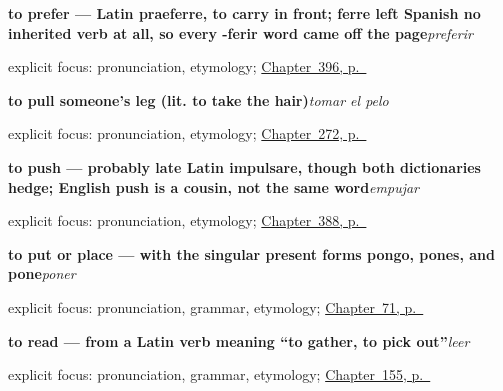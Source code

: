 \noindent\begin{minipage}[t]{\linewidth}
\raggedright
\textbf{to prefer — Latin praeferre, to carry in front; ferre left Spanish no inherited verb at all, so every -ferir word came off the page}\enspace\emph{preferir}\par
\footnotesize explicit focus: pronunciation, etymology; \hyperref[ch:aprender-y-cocinar]{Chapter~396, p.~\pageref*{ch:aprender-y-cocinar}}
\end{minipage}\par\smallskip

\noindent\begin{minipage}[t]{\linewidth}
\raggedright
\textbf{to pull someone's leg (lit. to take the hair)}\enspace\emph{tomar el pelo}\par
\footnotesize explicit focus: pronunciation, etymology; \hyperref[ch:entrelineas]{Chapter~272, p.~\pageref*{ch:entrelineas}}
\end{minipage}\par\smallskip

\noindent\begin{minipage}[t]{\linewidth}
\raggedright
\textbf{to push — probably late Latin impulsare, though both dictionaries hedge; English push is a cousin, not the same word}\enspace\emph{empujar}\par
\footnotesize explicit focus: pronunciation, etymology; \hyperref[ch:empujar-y-lanzar]{Chapter~388, p.~\pageref*{ch:empujar-y-lanzar}}
\end{minipage}\par\smallskip

\noindent\begin{minipage}[t]{\linewidth}
\raggedright
\textbf{to put or place — with the singular present forms pongo, pones, and pone}\enspace\emph{poner}\par
\footnotesize explicit focus: pronunciation, grammar, etymology; \hyperref[ch:spanish-poner]{Chapter~71, p.~\pageref*{ch:spanish-poner}}
\end{minipage}\par\smallskip

\noindent\begin{minipage}[t]{\linewidth}
\raggedright
\textbf{to read — from a Latin verb meaning \textquotedblleft{}to gather, to pick out\textquotedblright{}}\enspace\emph{leer}\par
\footnotesize explicit focus: pronunciation, grammar, etymology; \hyperref[ch:spanish-leer]{Chapter~155, p.~\pageref*{ch:spanish-leer}}
\end{minipage}\par\smallskip


